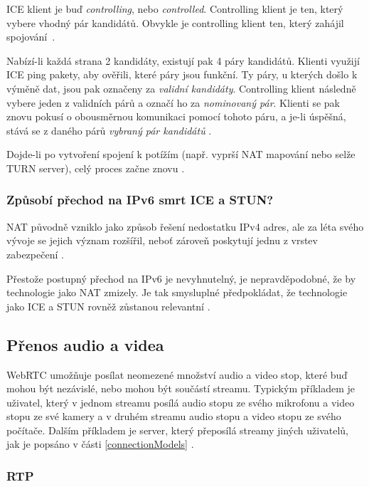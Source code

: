 ICE klient je buď \textit{controlling}, nebo \textit{controlled}. Controlling
klient je ten, který vybere vhodný pár kandidátů. Obvykle je controlling klient
ten, který zahájil spojování~\cite{WebRTCForTheCurious}.

Nabízí-li každá strana 2 kandidáty, existují pak 4 páry kandidátů. Klienti
využijí ICE ping pakety, aby ověřili, které páry jsou funkční. Ty páry, u
kterých došlo k výměně dat, jsou pak označeny za \textit{validní kandidáty}.
Controlling klient následně vybere jeden z validních párů a označí ho za
\textit{nominovaný pár}. Klienti se pak znovu pokusí o obousměrnou komunikaci
pomocí tohoto páru, a je-li úspěšná, stává se z daného párů \textit{vybraný pár
    kandidátů} \cite{WebRTCForTheCurious}.

Dojde-li po vytvoření spojení k potížím (např. vyprší NAT mapování nebo selže
TURN server), celý proces začne znovu \cite{WebRTCForTheCurious}.

\subsubsection{Způsobí přechod na IPv6 smrt ICE a STUN?}

NAT původně vzniklo jako způsob řešení nedostatku IPv4 adres, ale za léta svého
vývoje se jejich význam rozšířil, neboť zároveň poskytují jednu z vrstev
zabezpečení \cite{Quora-WillIPv6KillSTUNAndICE}.

Přestože postupný přechod na IPv6 je nevyhnutelný, je nepravděpodobné, že by
technologie jako NAT zmizely. Je tak smysluplné předpokládat, že technologie
jako ICE a STUN rovněž zůstanou relevantní \cite{Quora-WillIPv6KillSTUNAndICE}.

\subsection{Přenos audio a videa}

WebRTC umožňuje posílat neomezené množství audio a video stop, které buď mohou
být nezávislé, nebo mohou být součástí streamu. Typickým příkladem je uživatel,
který v jednom streamu posílá audio stopu ze svého mikrofonu a video stopu ze
své kamery a v druhém streamu audio stopu a video stopu ze svého počítače.
Dalším příkladem je server, který přeposílá streamy jiných uživatelů, jak je
popsáno v části \ref{connectionModels} \cite{WebRTCForTheCurious}.

\subsubsection{RTP}\label{rtp}

